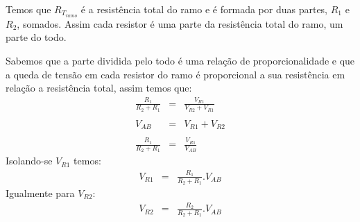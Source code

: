 Temos que $R_{T_{ramo}}$ é a resistência total do ramo e é formada por duas partes, $R_1$ e $R_2$, somados. Assim cada resistor é uma parte da resistência total do ramo, um parte do todo.

Sabemos que a parte dividida pelo todo é uma relação de proporcionalidade e que a queda de tensão em cada resistor do ramo é proporcional a sua resistência em relação a resistência total, assim temos que:
\begin{eqnarray}
\frac{R_1}{R_2+R_1} & = & \frac{V_{R1}}{V_{R2}+V_{R1}}\\
\nonumber\\
V_{AB} & = & V_{R1} + V_{R2} \\
\nonumber\\
\frac{R_1}{R_2+R_1} & = & \frac{V_{R1}}{V_{AB}}
\end{eqnarray}
Isolando-se $V_{R1}$  temos:
\begin{eqnarray}
V_{R1} & = & \frac{R_1}{R_2 + R_1} . V_{AB}
\end{eqnarray}
Igualmente para $V_{R2}$:
\begin{eqnarray}
V_{R2} & = & \frac{R_2}{R_2 + R_1} . V_{AB}
\end{eqnarray}
